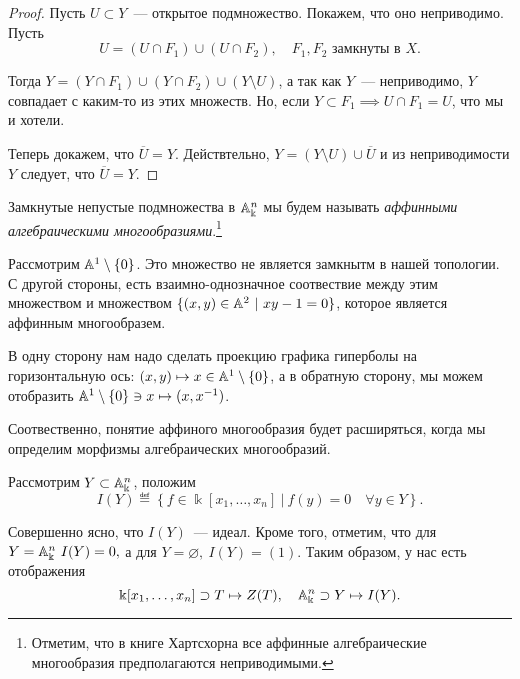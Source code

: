 	\begin{proof}
		Пусть $U \subset Y$~--- открытое подмножество. Покажем, что оно неприводимо. Пусть 
		\[
			U = (U \cap F_1) \cup (U \cap F_2), \quad F_1, F_2 \text{ замкнуты в } X.
		\]

		Тогда $Y = (Y \cap F_1) \cup (Y \cap F_2) \cup (Y \setminus U)$, а так как $Y$~--- неприводимо, $Y$ совпадает с каким-то из этих множеств. Но, если $Y \subset F_1 \implies U \cap F_1 = U$, что мы и хотели. 

		Теперь докажем, что $\overline{U} = Y$. Действтельно, $Y = (Y \setminus U) \cup \overline{U}$ и из неприводимости $Y$ следует, что $\overline{U} = Y$.
	\end{proof}

	\begin{definition} 
		Замкнутые непустые подмножества в $\AA_{\Bbbk}^n$ мы будем называть \emph{аффинными алгебраическими многообразиями}.\footnote{Отметим, что в книге Хартсхорна все аффинные алгебраические многообразия предполагаются неприводимыми. }
	\end{definition}

	\begin{example}
		Рассмотрим $\AA^1 \setminus \{ 0 \}$. Это множество не является замкнытм в нашей топологии. С другой стороны, есть взаимно-однозначное соотвествие между этим множеством и множеством $ \{ (x, y) \in \AA^2 \ \vert \ xy - 1 = 0 \}$, которое является аффинным многообразем. 

		В одну сторону нам надо сделать проекцию графика гиперболы на горизонтальную ось: $(x, y) \mapsto x \in \AA^1 \setminus \{ 0 \}$, а в обратную сторону, мы можем отобразить $\AA^1 \setminus \{ 0 \} \ni x \mapsto (x, x^{-1})$.
	\end{example}

	Соотвественно, понятие аффиного многообразия будет расширяться, когда мы определим морфизмы алгебраических многообразий. 

	Рассмотрим $Y \subset \AA_{\Bbbk}^n$, положим 
	\[
		I(Y) \eqdef \left\{ f \in \Bbbk[x_1, \ldots, x_n] \ \vert \ f(y) = 0 \quad \forall y \in Y \right\}.
	\]

	Совершенно ясно, что $I(Y)$~--- идеал. Кроме того, отметим, что для $Y = \AA_{\Bbbk}^n \ I(Y) = 0,$ а для $Y = \varnothing, \ I(Y) = (1)$. Таким образом, у нас есть отображения 
	\[
		\Bbbk[x_1, \ldots, x_n] \supset T \mapsto Z(T), \quad \AA_{\Bbbk}^n \supset Y \mapsto I(Y).
	\]

